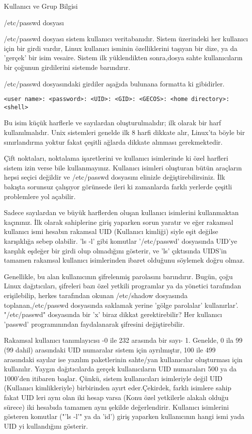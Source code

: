 \begin{section}{Kullanıcı ve Grup Bilgisi}
\begin{subsection}{/etc/passwd dosyası}

/etc/passwd dosyası sistem kullanıcı veritabanıdır. Sistem üzerindeki her kullanıcı için bir girdi vardır, Linux kullanıcı isminin özelliklerini taşıyan bir dize, ya da 'gerçek' bir isim vesaire. Sistem ilk yüklendikten sonra,dosya sahte kullanıcıların bir çoğunun girdilerini sistemde barındırır.

/etc/passwd dosyasındaki girdiler aşağıda bulunana formatta ki gibidirler.
\begin{verbatim}
<user name>: <password>: <UID>: <GID>: <GECOS>: <home directory>: <shell>
\end{verbatim}

Bu isim küçük harflerle ve sayılardan oluşturulmalıdır; ilk olarak bir harf kullanılmalıdır. Unix sistemleri genelde ilk 8 harfi dikkate alır,
Linux'ta böyle bir sınırlandırma yoktur fakat çeşitli ağlarda dikkate alınması gerekmektedir.

Çift noktaları, noktalama işaretlerini ve kullanıcı isimlerinde ki özel harfleri sistem izin verse bile kullanmayınız. Kullanıcı isimleri oluşturan bütün araçların hepsi seçici değildir ve /etc/passwd dosyasını elinizle değiştirebilirsiniz. İlk bakışta sorunsuz çalışıyor görünsede ileri ki zamanlarda farklı yerlerde çeşitli problemlere yol açabilir.

Sadece sayılardan ve büyük harflerden oluşan kullanıcı isimlerini kullanmaktan kaçınınız. İlk olarak sahiplerine giriş yaparken sorun yaratır ve eğer rakamsal kullanıcı ismi hesabın rakamsal UID (Kullanıcı kimliği) siyle eşit değilse karışıklığa sebep olabilir. 'ls -l' gibi komutlar '/etc/passwd' dosyasında UID'ye karşılık eşdeğer bir girdi olup olmadığını gösterir, ve 'ls' çıktısında
UIDS'in tamamen rakamsal kullanıcı isimlerinden ibaret olduğunu söylemek doğru olmaz.

Genellikle, bu alan kullanıcının şifrelenmiş parolasını barındırır. Bugün, çoğu Linux dağıtıcıları, şifreleri bazı özel yetkili programlar ya da yönetici tarafından erişilebilip, herkes tarafından okunan /etc/shadow dosyasında toplanan,/etc/passwd dosyasında saklamak yerine 'gölge parolalar' kullanırlar'. "/etc/passwd" dosyasında bir 'x' biraz dikkat gerektirebilir? Her kullanıcı 'passwd' programınından faydalanarak şifresini değiştirebilir.

Rakamsal kullanıcı tanımlayıcısı -0 ile 232 arasında bir sayı- 1. Genelde, 0 ila 99 (99 dahil) arasındaki UID numaralar sistem için ayrılmıştır, 100 ile 499 arasındaki sayılar ise yazılım paketlerinin sahte/yan kullanıcılar oluşturması için kullanılır. Yaygın dağıtıcılarda gerçek kullanıcıların UID numaraları 500 ya da 1000'den itibaren başlar. Çünkü, sistem kullanıcıları isimleriyle değil UID (Kullanıcı kimlikleriyle) birbirinden ayırt eder.Çekirdek, farklı isimlere sahip fakat UID leri aynı olan iki hesap varsa (Konu özel yetkilerle alakalı
olduğu sürece) iki hesabıda tamamen aynı şekilde değerlendirir. Kullanıcı isimlerini gösteren komutlar ("'ls -l'" ya da 'id') giriş yaparken kullanıcının hangi ismi yada UID yi kullandığını gösterir.


\end{subsection}
\end{section}
